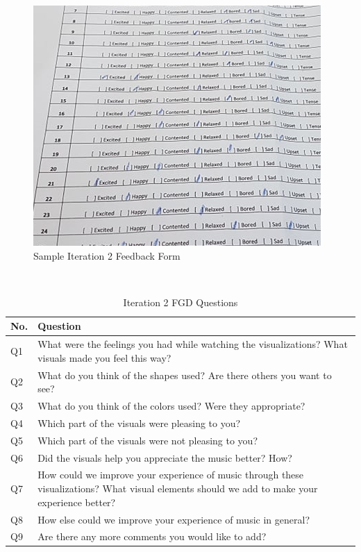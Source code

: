\begin{figure}[h]
	\centering
	\includegraphics[width=1\columnwidth]{figures/checkboxes.png}
    \caption{Sample Iteration 2 Feedback Form}
    \label{fig:iter2feedback}
\end{figure}

\begin{table}
  \centering
  \caption{Iteration 2 FGD Questions}~\label{tab:QI2}
  \addtolength{\tabcolsep}{2pt} 
  \begin{tabular}{p{.5cm}|p{7cm}}
  	\toprule
    \rule{0pt}{8pt}No. & Question \\[2pt]
    \toprule
    Q1 & What were the feelings you had while watching the visualizations? What visuals made you feel this way? \\
    Q2 & What do you think of the shapes used? Are there others you want to see? \\
    Q3 & What do you think of the colors used? Were they appropriate? \\
    Q4 & Which part of the visuals were pleasing to you? \\
	Q5 & Which part of the visuals were not pleasing to you? \\
	Q6 & Did the visuals help you appreciate the music better? How? \\
	Q7 & How could we improve your experience of music through these visualizations? What visual elements should we add to make your experience better? \\
	Q8 & How else could we improve your experience of music in general? \\
	Q9 & Are there any more comments you would like to add? \\
    \bottomrule
  \end{tabular}
  \addtolength{\tabcolsep}{-2pt} 
\end{table}

